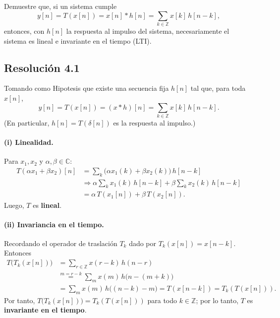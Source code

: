 \documentclass[
  11pt,
  letterpaper,
   addpoints,
  ]{exam}
\begin{document}
\begin{questions}
\question Demuestre que, si un sistema cumple
\[ y[n]=T(x[n])=x[n]*h[n]=\sum_{k\in\mathbb{Z}} x[k] \, h[n-k], \]
entonces, con \(h[n]\) la respuesta al impulso del sistema, necesariamente el sistema es lineal e invariante en el tiempo (LTI).


\begin{solution}
\subsection*{Resolución 4.1}
  Tomando como Hipotesis que existe una secuencia fija $h[n]$ tal que, para toda $x[n]$,
  \begin{equation}
y[n] = T(x[n])= (x*h)[n] =\sum_{k\in\mathbb Z} x[k]\,h[n-k].
\end{equation}
(En particular, $h[n]=T(\delta[n])$ es la respuesta al impulso.)

\paragraph{(i) Linealidad.}
Para $x_1,x_2$ y $\alpha,\beta\in\mathbb C$:
\begin{align}
T(\alpha x_1+\beta x_2)[n]
&= \sum_{k} \big(\alpha x_1(k)+\beta x_2(k)\big)\,h[n-k] \nonumber\\
&\Rightarrow \alpha \sum_{k} x_1(k)\,h[n-k]+\beta \sum_{k} x_2(k)\,h[n-k] \nonumber\\
&= \alpha\,T(x_1[n])+\beta\,T(x_2[n]).
\end{align}
Luego, $T$ es \textbf{lineal}.

\paragraph{(ii) Invariancia en el tiempo.}
Recordando el operador de traslación $T_k$ dado por $T_k(x[n])=x[n-k]$. Entonces
\begin{align}
T\big(T_k(x[n])\big)
&= \sum_{r \in \mathbb{Z}} x(r-k)\,h(n-r) \nonumber\\
&\overset{m=r-k}{=} \sum_{m} x(m)\,h\big(n-(m+k)\big) \nonumber\\
&= \sum_{m} x(m)\,h\big((n-k)-m\big)
 = T(x[n-k]) = T_k(T(x[n])).
\end{align}
Por tanto, $T\big(T_k(x[n])\big)=T_k(T(x[n]))$ para todo $k\in\mathbb Z$; por lo tanto, $T$ es \textbf{invariante en el tiempo}.

\end{solution}


\end{questions}
\end{document}
